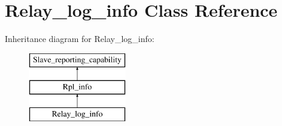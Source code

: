 \hypertarget{classRelay__log__info}{}\section{Relay\+\_\+log\+\_\+info Class Reference}
\label{classRelay__log__info}
Inheritance diagram for Relay\+\_\+log\+\_\+info\+:\begin{figure}[H]
\begin{center}
\leavevmode
\includegraphics[height=3.000000cm]{classRelay__log__info}
\end{center}
\end{figure}
